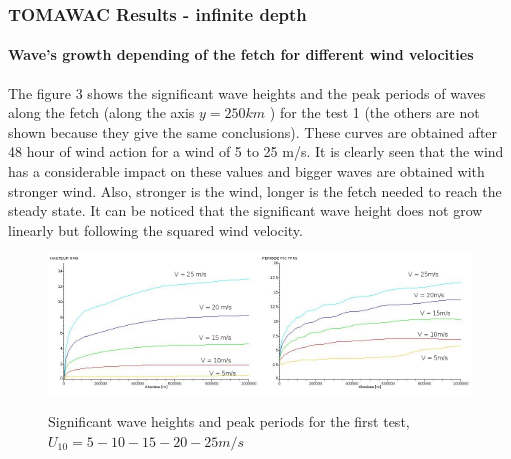 \subsubsection{TOMAWAC Results - infinite depth }
\paragraph{Wave's growth depending of the fetch for different wind velocities}
The figure 3 shows the significant wave heights and the peak periods of waves along the fetch (along the axis $ y = 250 km$ ) for the test 1 (the others are not shown because they give the same conclusions). These curves are obtained after 48 hour of wind action for a wind of 5 to 25 m/s. It is clearly seen that the wind has a considerable impact on these values and bigger waves are obtained with stronger wind. Also, stronger is the wind, longer is the fetch needed to reach the steady state. It can be noticed that the significant wave height does not grow linearly but following the squared wind velocity.
\begin{figure}[H]
  \centering
  	\includegraphics[width=0.5\textwidth]{Hm0_free_mesh.jpg}\includegraphics[width=0.5\textwidth]{Tp_free_mesh.jpg}
      \caption{Significant wave heights and peak periods for the first test, $U_{10} = 5 - 10 - 15 - 20 - 25 m/s$}
\end{figure}
